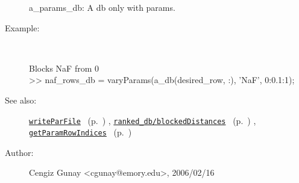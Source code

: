 \begin{description}
   a\_params\_db: A db only with params.
%
\item[Example:]~
\begin{lyxcode} Blocks NaF from 0%
\\%
 >> naf\_rows\_db = varyParams(a\_db(desired\_row, :), 'NaF', 0:0.1:1);
\\%
\end{lyxcode}
%
\item[See also:]%
\hyperlink{ref_writeParFile}{\texttt{writeParFile}}%
\ (p.~\pageref{ref_writeParFile})%
%
, \hyperlink{ref_ranked_db__blockedDistances}{\texttt{ranked\_db/blockedDistances}}%
\ (p.~\pageref{ref_ranked_db__blockedDistances})%
%
, \hyperlink{ref_getParamRowIndices}{\texttt{getParamRowIndices}}%
\ (p.~\pageref{ref_getParamRowIndices})%
%
%
\item[Author:]%
Cengiz Gunay <cgunay@emory.edu>, 2006/02/16
%
\end{description}
\methodline%
